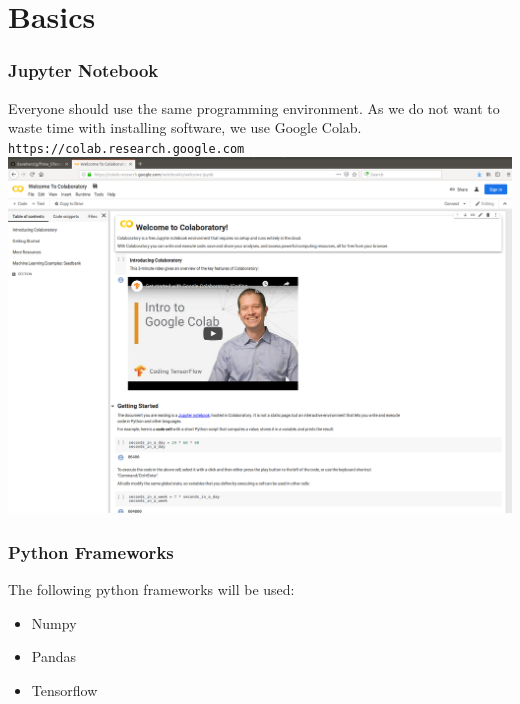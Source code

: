 \section{Basics}

\begin{frame}[fragile]
  \frametitle{Jupyter Notebook}
  Everyone should use the same programming environment. As we do not want to waste time with
  installing software, we use Google Colab.\\
  \verb|https://colab.research.google.com|\\
  \vspace{3mm}
  \includegraphics[scale=0.1]{img/jupyter_notebook}
\end{frame}


\begin{frame}[fragile]
  \frametitle{Python Frameworks}
  The following python frameworks will be used:
  \begin{itemize}
  \item Numpy
  \item Pandas
  \item Tensorflow
  \end{itemize}
\end{frame}
